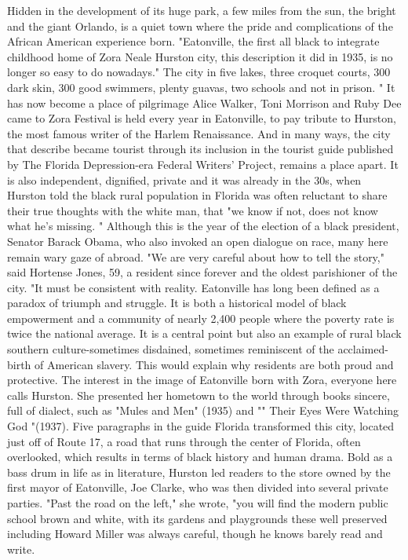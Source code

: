 Hidden in the development of its huge park, a few miles from the sun, the bright and the giant Orlando, is a quiet town where the pride and complications of the African American experience born.
"Eatonville, the first all black to integrate childhood home of Zora Neale Hurston city, this description it did in 1935, is no longer so easy to do nowadays." The city in five lakes, three croquet courts, 300 dark skin, 300 good swimmers, plenty guavas, two schools and not in prison. "
It has now become a place of pilgrimage
Alice Walker, Toni Morrison and Ruby Dee came to Zora Festival is held every year in Eatonville, to pay tribute to Hurston, the most famous writer of the Harlem Renaissance.
And in many ways, the city that describe became tourist through its inclusion in the tourist guide published by The Florida Depression-era Federal Writers' Project, remains a place apart.
It is also independent, dignified, private and it was already in the 30s, when Hurston told the black rural population in Florida was often reluctant to share their true thoughts with the white man, that "we know if not, does not know what he's missing. "
Although this is the year of the election of a black president, Senator Barack Obama, who also invoked an open dialogue on race, many here remain wary gaze of abroad.
"We are very careful about how to tell the story," said Hortense Jones, 59, a resident since forever and the oldest parishioner of the city.
"It must be consistent with reality.
Eatonville has long been defined as a paradox of triumph and struggle.
It is both a historical model of black empowerment and a community of nearly 2,400 people where the poverty rate is twice the national average.
It is a central point but also an example of rural black southern culture-sometimes disdained, sometimes reminiscent of the acclaimed-birth of American slavery.
This would explain why residents are both proud and protective.
The interest in the image of Eatonville born with Zora, everyone here calls Hurston.
She presented her hometown to the world through books sincere, full of dialect, such as "Mules and Men" (1935) and "" Their Eyes Were Watching God "(1937).
Five paragraphs in the guide Florida transformed this city, located just off of Route 17, a road that runs through the center of Florida, often overlooked, which results in terms of black history and human drama.
Bold as a bass drum in life as in literature, Hurston led readers to the store owned by the first mayor of Eatonville, Joe Clarke, who was then divided into several private parties.
"Past the road on the left," she wrote, "you will find the modern public school brown and white, with its gardens and playgrounds these well preserved including Howard Miller was always careful, though he knows barely read and write.
